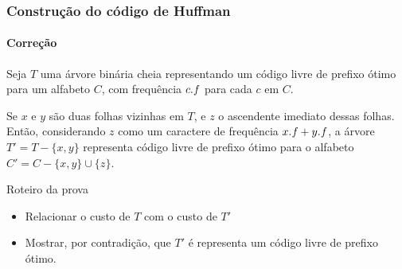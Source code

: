 \documentclass{beamer}
\begin{document}

\begin{frame}
\frametitle{Construção do código de Huffman}
\framesubtitle{Correção}

\begin{lemma}
Seja $T$ uma árvore binária cheia representando um código livre de prefixo ótimo
para um alfabeto $C$, com frequência $\attrib{c}{f}$ para cada $c$ em $C$.  

Se $x$ e $y$ são duas folhas vizinhas em $T$, e $z$ o ascendente imediato
dessas folhas. Então, considerando $z$ como um caractere de frequência $\attrib{x}{f} + \attrib{y}{f}$,
a árvore $T' = T - \{ x, y \}$ representa código livre de prefixo ótimo para
o alfabeto $C'= C - \{ x, y \} \cup \{ z \}$.

\end{lemma}

Roteiro da prova
\begin{itemize}
\item Relacionar o custo de $T$ com o custo de $T'$
\item Mostrar, por contradição, que $T'$ é representa um código livre de prefixo ótimo.
\end{itemize}

\end{frame}

\end{document}
